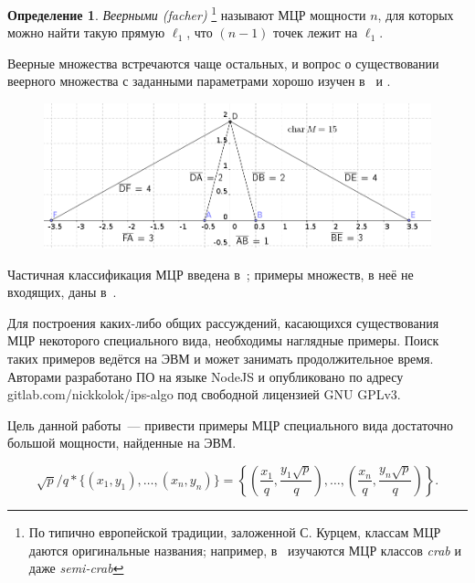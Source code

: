 \documentclass[10pt,pdf,hyperref={unicode},aspectratio=169]{beamer}
\theoremstyle{definition}
\newtheorem{ddefinition}[llemma]{Определение}
\begin{document}
\begin{frame}
	\begin{ddefinition}
		\emph{Веерными (facher)}%
		\footnote{
			По типично европейской традиции, заложенной С. Курцем, классам МЦР даются оригинальные названия;
			например, в~\cite{crabs} изучаются МЦР классов {\it crab} и даже {\it semi-crab}
		}
		называют МЦР мощности $n$, для которых можно найти
		такую прямую $\ell_1$, что $(n - 1)$ точек лежит на $\ell_1$.
	\end{ddefinition}

	\vfill

	Веерные множества встречаются чаще остальных,
	и вопрос о существовании веерного множества с заданными параметрами хорошо изучен в~\cite{bib:04} и \cite[Теорема 5]{bib:05}.

	\vfill

    \begin{figure}[h!]
    	\centering
    	\includegraphics[width=0.7\linewidth]{facher-5.png}
    \end{figure}

\end{frame}

\begin{frame}
	Частичная классификация МЦР введена в~\cite{bib:06}; примеры множеств, в неё не входящих, даны в~\cite{bib:07}.

	\vfill

	Для построения каких-либо общих рассуждений, касающихся существования МЦР некоторого специального вида,
	необходимы наглядные примеры.
	Поиск таких примеров ведётся на ЭВМ и может занимать продолжительное время.
	Авторами разработано ПО на языке NodeJS и опубликовано по адресу gitlab.com/nickkolok/ips-algo
	под свободной лицензией GNU GPLv3.

	\vfill


	Цель данной работы~--- привести примеры МЦР специального вида достаточно большой мощности,
	найденные на ЭВМ.

	\vfill

    \begin{equation*}
        \sqrt p/q * \{(x_1, y_1), \ldots, (x_n, y_n)\} =
        \left\{\left(\frac{x_1}q, \frac{y_1\sqrt p}q\right),
        \ldots, \left(\frac{x_n}q, \frac{y_n\sqrt p}q\right)\right\}.
    \end{equation*}


\end{frame}
\end{document}
